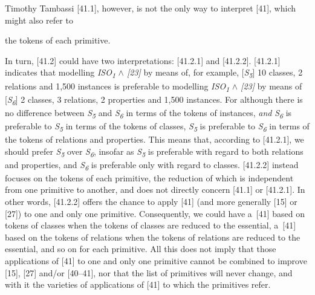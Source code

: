 \begin{artengenv}{Timothy Tambassi}
[41.1], however, is not the only way to interpret [41], which might also refer to





\begin{enumerate}[label={[\arabic*]}]



\item [{[41.2]}] the tokens of each primitive.

\end{enumerate}

In turn, [41.2] could have two interpretations: [41.2.1] and [41.2.2]. [41.2.1] indicates that modelling \textit{ISO}\textit{\textsubscript{1}} \textit{${\wedge}$ [23]} by means of, for example, [\textit{S}\textit{\textsubscript{5}}] 10 classes, 2 relations and 1,500 instances is preferable to modelling \textit{ISO}\textit{\textsubscript{1}} \textit{${\wedge}$ [23]} by means of [\textit{S}\textit{\textsubscript{6}}] 2 classes, 3 relations, 2 properties and 1,500 instances. For although there is no difference between \textit{S}\textit{\textsubscript{5}} and \textit{S}\textit{\textsubscript{6}} in terms of the tokens of instances, \textit{and} \textit{S}\textit{\textsubscript{6}} is preferable to \textit{S}\textit{\textsubscript{5}} in terms of the tokens of classes, \textit{S}\textit{\textsubscript{5}} is preferable to \textit{S}\textit{\textsubscript{6}} in terms of the tokens of relations and properties. This means that, according to [41.2.1], we should prefer \textit{S}\textit{\textsubscript{5}} over \textit{S}\textit{\textsubscript{6}}, insofar as \textit{S}\textit{\textsubscript{5}} is preferable with regard to both relations and properties, and \textit{S}\textit{\textsubscript{6}} is preferable only with regard to classes. [41.2.2] instead focuses on the tokens of each primitive, the reduction of which is independent from one primitive to another, and does not directly concern [41.1] or [41.2.1]. In other words, [41.2.2] offers the chance to apply [41] (and more generally [15] or [27]) to one and only one primitive. Consequently, we could have a~[41] based on tokens of classes when the tokens of classes are reduced to the essential, a~[41] based on the tokens of relations when the tokens of relations are reduced to the essential, and so on for each primitive. All this does not imply that those applications of [41] to one and only one primitive cannot be combined to improve [15], [27] and/or [40–41], nor that the list of primitives will never change, and with it the varieties of applications of [41] to which the primitives refer.




\end{artengenv}
